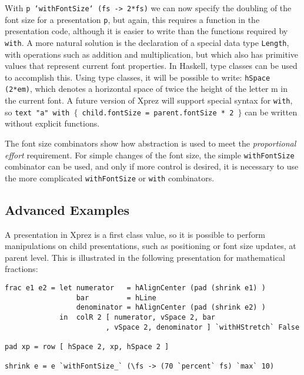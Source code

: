 \par With \texttt{p `withFontSize` (fs -> 2*fs)} we can now
        specify the doubling of the font size for a presentation \texttt{p}, but again,
        this requires a function in the presentation code, although it is easier to
        write than the functions required by \texttt{with}. A more natural
        solution is the declaration of a special data type \texttt{Length}, with
        operations such as addition and multiplication, but which also has primitive
        values that represent current font properties. In Haskell, type classes can be
        used to accomplish this. Using type classes, it will be possible to write:
        \linebreak \texttt{hSpace (2*em)}, which denotes a horizontal space of twice
        the height of the letter m in the current font. A future version of
        {\sc Xprez} will support special syntax for \texttt{with}, so \texttt{text
        "a" with $\{$ child.fontSize = parent.fontSize * 2 $\}$} can be written
        without explicit functions.
\par The font size combinators show how abstraction is used to meet the
        {\em proportional effort} requirement. For simple changes of the font size,
        the simple \texttt{withFontSize} combinator can be used, and only if more
        control is desired, it is necessary to use the more complicated
        \texttt{withFontSize} or \texttt{with} combinators.
\subsection{Advanced Examples}

\par A presentation in {\sc Xprez} is a first class value, so it is
        possible to perform manipulations on child presentations, such as positioning
        or font size updates, at parent level. This is illustrated in the following
        presentation for mathematical fractions: \begin{small}\begin{verbatim}frac e1 e2 = let numerator   = hAlignCenter (pad (shrink e1) )
                 bar         = hLine
                 denominator = hAlignCenter (pad (shrink e2) )
             in  colR 2 [ numerator, vSpace 2, bar
                        , vSpace 2, denominator ] `withHStretch` False

pad xp = row [ hSpace 2, xp, hSpace 2 ]
                 
shrink e = e `withFontSize_` (\fs -> (70 `percent` fs) `max` 10)\end{verbatim}\end{small}

